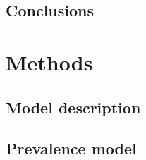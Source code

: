 \documentclass[11pt]{article}
\begin{document}
\subsection*{Conclusions}



%
%
%
\section*{Methods}

\subsection*{Model description}

\subsection*{Prevalence model}
\end{document}
